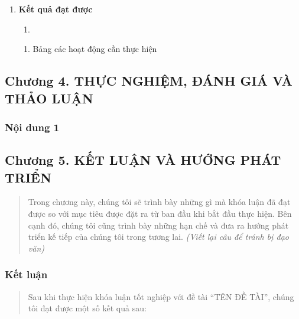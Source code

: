 \begin{enumerate}
\def\labelenumi{\arabic{enumi}.}
\setcounter{enumi}{3}
\item
  \textbf{Kết quả đạt được}

  \begin{enumerate}
  \def\labelenumii{\arabic{enumii}.}
  \tightlist
  \item
  \end{enumerate}

  \begin{enumerate}
  \def\labelenumii{\arabic{enumii}.}
  \item
    \protect{}\label{Cuxe1c_houx1ea1t_ux111ux1ed9ng_manual}{}Bảng các hoạt động cần thực hiện
  \end{enumerate}
\end{enumerate}

\subsection{Chương 4. THỰC NGHIỆM, ĐÁNH GIÁ VÀ THẢO LUẬN}\label{chux1b0ux1a1ng-4.-thux1ef1c-nghiux1ec7m-ux111uxe1nh-giuxe1-vuxe0-thux1ea3o-luux1eadn}

\subsubsection{Nội dung 1}\label{nux1ed9i-dung-1}

\subsection{Chương 5. KẾT LUẬN VÀ HƯỚNG PHÁT TRIỂN}\label{chux1b0ux1a1ng-5.-kux1ebft-luux1eadn-vuxe0-hux1b0ux1edbng-phuxe1t-triux1ec3n}

\begin{quote}
Trong chương này, chúng tôi sẽ trình bày những gì mà khóa luận đã đạt được so với mục tiêu được đặt ra từ ban đầu khi bắt đầu thực hiện. Bên cạnh đó, chúng tôi cũng trình bày những hạn chế và đưa ra hướng phát triển kế tiếp của chúng tôi trong tương lai. \emph{(Viết lại câu để tránh bị đạo văn)}
\end{quote}

\subsubsection{Kết luận}\label{kux1ebft-luux1eadn}

\begin{quote}
Sau khi thực hiện khóa luận tốt nghiệp với đề tài ``TÊN ĐỀ TÀI'', chúng tôi đạt được một số kết quả sau:
\end{quote}

